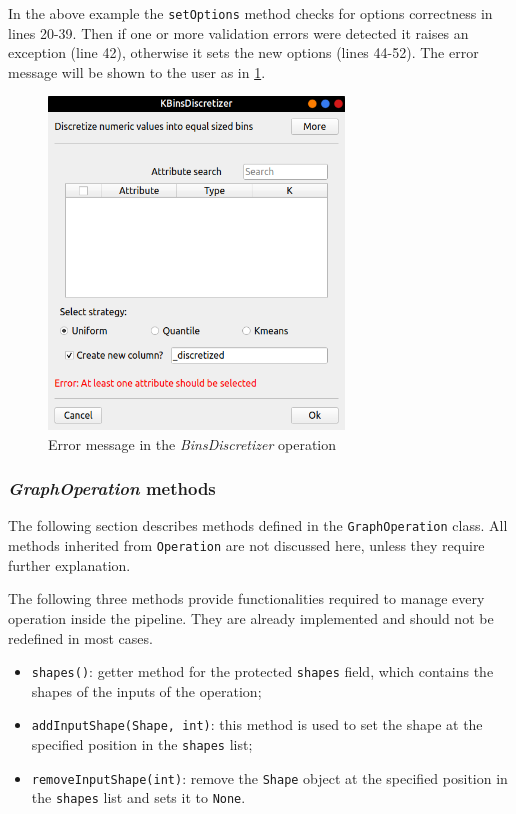 In the above example the \texttt{setOptions} method checks for options correctness in lines 20-39. Then if one or more validation errors were detected it raises an exception (line 42), otherwise it sets the new options (lines 44-52). The error message will be shown to the user as in \cref{fig:error-message-editor}.
\clearpage
\begin{figure}
	\centering
	\includegraphics[width=0.7\textwidth]{error-message-editor}
	\caption{Error message in the \textit{BinsDiscretizer} operation}
	\label{fig:error-message-editor}
\end{figure}
\subsubsection{\textit{GraphOperation} methods}
The following section describes methods defined in the \texttt{GraphOperation} class. All methods inherited from \texttt{Operation} are not discussed here, unless they require further explanation.

The following three methods provide functionalities required to manage every operation inside the pipeline. They are already implemented and should not be redefined in most cases.
\begin{itemize}
	\item \texttt{shapes()}: getter method for the protected \texttt{shapes} field, which contains the shapes of the inputs of the operation;
	\item \texttt{addInputShape(Shape, int)}: this method is used to set the shape at the specified position in the \texttt{shapes} list;
	\item \texttt{removeInputShape(int)}: remove the \texttt{Shape} object at the specified position in the \texttt{shapes} list and sets it to \texttt{None}.
\end{itemize}

